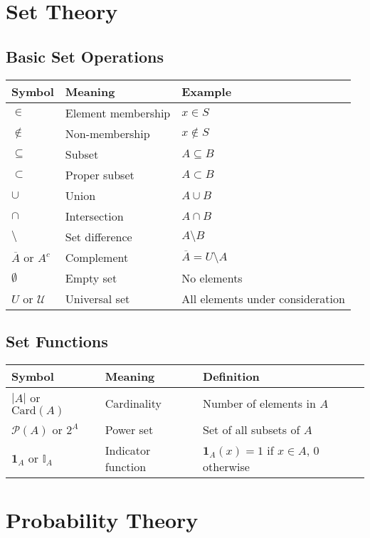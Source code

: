 \section{Set Theory}

\subsection{Basic Set Operations}

\begin{tabular}{|l|l|l|}
\hline
\textbf{Symbol} & \textbf{Meaning} & \textbf{Example} \\
\hline
$\in$ & Element membership & $x \in S$ \\
$\notin$ & Non-membership & $x \notin S$ \\
$\subseteq$ & Subset & $A \subseteq B$ \\
$\subset$ & Proper subset & $A \subset B$ \\
$\cup$ & Union & $A \cup B$ \\
$\cap$ & Intersection & $A \cap B$ \\
$\setminus$ & Set difference & $A \setminus B$ \\
$\overline{A}$ or $A^c$ & Complement & $\overline{A} = U \setminus A$ \\
$\emptyset$ & Empty set & No elements \\
$U$ or $\mathcal{U}$ & Universal set & All elements under consideration \\
\hline
\end{tabular}

\subsection{Set Functions}

\begin{tabular}{|l|l|l|}
\hline
\textbf{Symbol} & \textbf{Meaning} & \textbf{Definition} \\
\hline
$|A|$ or $\text{Card}(A)$ & Cardinality & Number of elements in $A$ \\
$\mathcal{P}(A)$ or $2^A$ & Power set & Set of all subsets of $A$ \\
$\mathbf{1}_A$ or $\mathbb{I}_A$ & Indicator function & $\mathbf{1}_A(x) = 1$ if $x \in A$, 0 otherwise \\
\hline
\end{tabular}

\section{Probability Theory}

